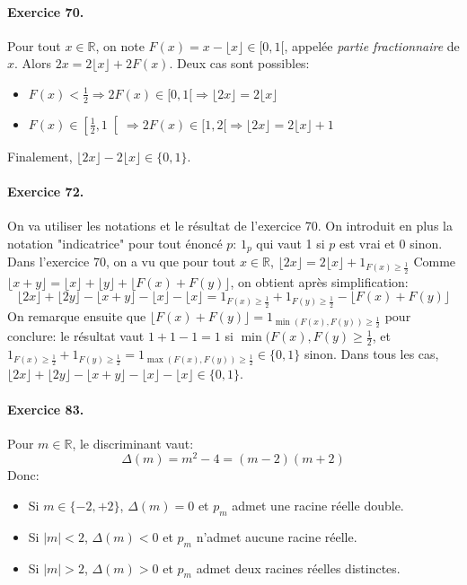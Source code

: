 \paragraph{Exercice 70.} Pour tout $x\in\mathbb{R}$, on note $F(x)=x-\lfloor x \rfloor \in [0,1[$, appelée \textit{partie fractionnaire} de $x$. Alors $2x=2\lfloor x \rfloor + 2F(x)$. Deux cas sont possibles:
\begin{itemize}
  \item $F(x)<\frac{1}{2}\Rightarrow 2F(x)\in [0,1[ \Rightarrow \lfloor 2x \rfloor = 2\lfloor x \rfloor $
  \item $F(x)\in \left[\frac{1}{2}, 1\right[ \Rightarrow 2F(x)\in [1,2[ \Rightarrow \lfloor 2x \rfloor = 2\lfloor x \rfloor + 1$
\end{itemize}
Finalement, $\lfloor 2x \rfloor - 2\lfloor x \rfloor\in \{0,1\}$. 


\paragraph{Exercice 72.} On va utiliser les notations et le résultat de l'exercice 70. On introduit en plus la notation "indicatrice" pour tout énoncé $p$: $1_{p}$ qui vaut 1 si $p$ est vrai et 0 sinon. 
Dans l'exercice 70, on a vu que pour tout $x \in \mathbb{R}$,
 $\lfloor 2x \rfloor = 2\lfloor x \rfloor + 1_{F(x)\geq \frac{1}{2}}$
Comme $\lfloor x+y \rfloor = \lfloor x \rfloor  + \lfloor y \rfloor + \lfloor F(x)+F(y) \rfloor$, on obtient après simplification:
\[
\lfloor 2x \rfloor + \lfloor 2y \rfloor  - \lfloor x+y \rfloor  - \lfloor x \rfloor  - \lfloor x \rfloor = 1_{F(x)\geq \frac{1}{2}} + 1_{F(y)\geq \frac{1}{2}} - \lfloor F(x)+F(y) \rfloor 
\]
On remarque ensuite que $\lfloor F(x)+F(y) \rfloor = 1_{\min(F(x),F(y))\geq \frac{1}{2}}$ pour conclure: le résultat vaut $1+1-1=1$ si $\min(F(x), F(y)\geq \frac{1}{2}$, et $1_{F(x)\geq \frac{1}{2}} + 1_{F(y)\geq \frac{1}{2}} = 1_{\max(F(x), F(y))\geq \frac{1}{2}} \in \{0,1\}$ sinon. Dans tous les cas, $\lfloor 2x \rfloor + \lfloor 2y \rfloor  - \lfloor x+y \rfloor  - \lfloor x \rfloor  - \lfloor x \rfloor \in \{0,1\}$.

\paragraph{Exercice 83.} Pour $m\in\mathbb{R}$, le discriminant vaut:
\[
\Delta(m)=m^2-4=(m-2)(m+2)
\]
Donc:
\begin{itemize}
  \item Si $m\in\{-2,+2\}$, $\Delta(m)=0$ et $p_m$ admet une racine réelle double.
  \item Si $|m|<2$, $\Delta(m)<0$ et $p_m$ n'admet aucune racine réelle.
  \item Si $|m|>2$, $\Delta(m)>0$ et $p_m$ admet deux racines réelles distinctes.
\end{itemize}
